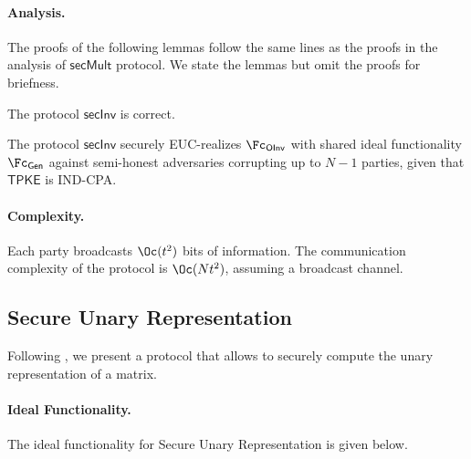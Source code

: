   \paragraph{Analysis.} The proofs of the following lemmas follow the same lines as the proofs in the analysis of $\mathsf{secMult}$ protocol. We state the lemmas but omit the proofs for briefness.
  
  \begin{lemma}
    The protocol $\mathsf{secInv}$ is correct.
  \end{lemma}{}
  \begin{lemma}
    The protocol $\mathsf{secInv}$ securely EUC-realizes $\Fc_\mathsf{OInv}$  with shared ideal functionality $\Fc_\mathsf{Gen}$ against semi-honest adversaries corrupting up to $N-1$ parties, given that $\mathsf{TPKE}$ is IND-CPA.
  \end{lemma}{}
  
  \paragraph{Complexity.} Each party broadcasts $\Oc(t^2)$ bits of information. The communication complexity of the protocol is $\Oc(Nt^2)$, assuming a broadcast channel.
  
  
\subsection{Secure Unary Representation}
\label{subsec:SUR}
Following \cite{TCC:KMWF07}, we present a protocol that allows to securely compute the unary representation of  a matrix.
 
 
 \paragraph{Ideal Functionality.} The ideal functionality for Secure Unary Representation is given below.
  \begin{center}
\end{center}
 
